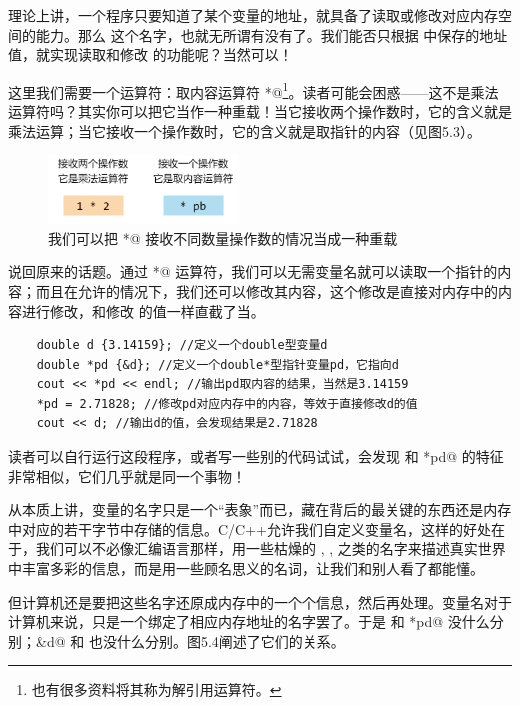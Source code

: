 理论上讲，一个程序只要知道了某个变量的地址，就具备了读取或修改对应内存空间的能力。那么 \lstinline@d@ 这个名字，也就无所谓有没有了。我们能否只根据 \lstinline@pd@ 中保存的地址值，就实现读取和修改 \lstinline@d@ 的功能呢？当然可以！\par
这里我们需要一个运算符：取内容运算符 \lstinline@*@\footnote{也有很多资料将其称为解引用运算符。}。读者可能会困惑——这不是乘法运算符吗？其实你可以把它当作一种重载！当它接收两个操作数时，它的含义就是乘法运算；当它接收一个操作数时，它的含义就是取指针的内容（见图5.3）。\par
\begin{figure}[htbp]
    \centering
    \includegraphics[width=0.45\textwidth]{../images/generalized_parts/05_operator_dereference_or_multiplication_300.png}
    \caption{我们可以把 \lstinline@*@ 接收不同数量操作数的情况当成一种重载}
\end{figure}
说回原来的话题。通过 \lstinline@*@ 运算符，我们可以无需变量名就可以读取一个指针的内容；而且在允许的情况下，我们还可以修改其内容，这个修改是直接对内存中的内容进行修改，和修改 \lstinline@d@ 的值一样直截了当。\par
\begin{lstlisting}
    double d {3.14159}; //定义一个double型变量d
    double *pd {&d}; //定义一个double*型指针变量pd，它指向d
    cout << *pd << endl; //输出pd取内容的结果，当然是3.14159
    *pd = 2.71828; //修改pd对应内存中的内容，等效于直接修改d的值
    cout << d; //输出d的值，会发现结果是2.71828
\end{lstlisting}
读者可以自行运行这段程序，或者写一些别的代码试试，会发现 \lstinline@d@ 和 \lstinline@*pd@ 的特征非常相似，它们几乎就是同一个事物！\par
从本质上讲，变量的名字只是一个``表象''而已，藏在背后的最关键的东西还是内存中对应的若干字节中存储的信息。C/C++允许我们自定义变量名，这样的好处在于，我们可以不必像汇编语言那样，用一些枯燥的 \lstinline@rip@, \lstinline@rsp@, \lstinline@eax@ 之类的名字来描述真实世界中丰富多彩的信息，而是用一些顾名思义的名词，让我们和别人看了都能懂。\par
但计算机还是要把这些名字还原成内存中的一个个信息，然后再处理。变量名对于计算机来说，只是一个绑定了相应内存地址的名字罢了。于是 \lstinline@d@ 和 \lstinline@*pd@ 没什么分别；\lstinline@&d@ 和 \lstinline@pd@ 也没什么分别。图5.4阐述了它们的关系。\par
